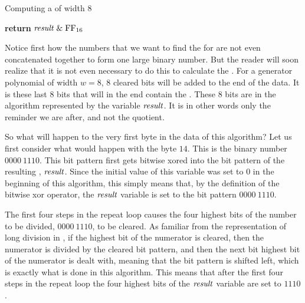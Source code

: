 \begin{algorithm}[H]
  \caption{Computing a \crc of width 8}
  \label{alg:crc8-comp}
  \begin{algorithmic}[1]


    \Else
    \EndIf
    \EndRepeatn

    \EndForEach

    \State \textbf{return}  $\mathit{result} \mathrel{\&} \mbox{\ensuremath{\mathrm{FF}_{16}}}$
    \EndProcedure

  \end{algorithmic}
\end{algorithm}

Notice first how the numbers that we want to find the \crc for are not
even concatenated together to form one large binary number.  But the
reader will soon realize that it is not even necessary to do this to
calculate the \crc.  For a generator polynomial of width $w=8$, $8$
cleared bits will be added to the end of the data. It is these last
$8$ bits that will in the end contain the \crc. These 8 bits are in the
algorithm represented by the variable $\mathit{result}$. It is in other words
only the reminder we are after, and not the quotient.

So what will happen to the very first byte in the data of this
algorithm? Let us first consider what would happen with the byte
$14$. This is the binary number $0000\ 1110$. This bit pattern first
gets bitwise xored into the bit pattern of the resulting \crc,
$\mathit{result}$. Since the initial value of this variable was set to $0$ in
the beginning of this algorithm, this simply means that, by the
definition of the bitwise xor operator, the $\mathit{result}$ variable is set
to the bit pattern $0000\ 1110$.

The first four steps in the repeat loop causes the four highest bits
of the number to be divided, $0000\ 1110$, to be cleared. As familiar
from the representation of long division in \crc, if the highest bit of
the numerator is cleared, then the numerator is divided by the cleared
bit pattern, and then the next bit highest bit of the numerator is
dealt with, meaning that the bit pattern is shifted left, which is
exactly what is done in this algorithm. This means that after the
first four steps in the repeat loop the four highest bits of the
$\mathit{result}$ variable are set to $1110$.

